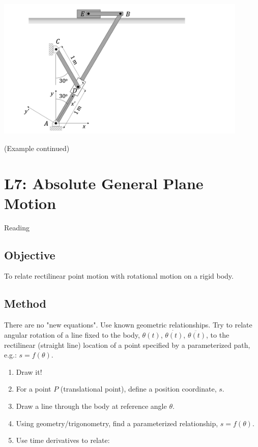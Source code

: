 \documentclass[12pt,letterpaper,twoside]{report}
\begin{document}
\includegraphics[trim={1cm 0cm 10cm 0cm},clip,width=0.9\textwidth, left]{Slide32} 

\vspace*{20\baselineskip}
\newpage
(Example continued)

\chapter{L7: Absolute General Plane Motion}
Reading

\section{Objective}
To relate rectilinear point motion with rotational motion on a rigid body. 

\section{Method}
There are no "new equations". Use known geometric relationships. Try to relate angular rotation of a line fixed to the body, $\theta(t)$, $\dot{\theta(t)}$, $\ddot{\theta(t)}$, to the rectilinear (straight line) location of a point specified by a parameterized path, e.g.: $s=f(\theta)$. 

\begin{enumerate}
\item Draw it!
\item For a point $P$ (translational point), define a position coordinate, $s$. 
\item Draw a line through the body at reference angle $\theta$. 
\item Using geometry/trigonometry, find a parameterized relationship, $s=f(\theta)$. 
\item Use time derivatives to relate: 
\end{enumerate}
\end{document}
